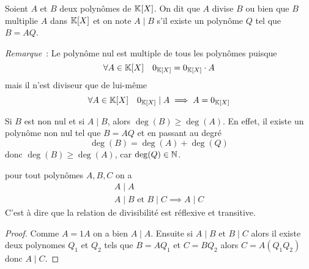 \begin{defdef}
  Soient \(A\) et \(B\) deux polynômes de \(\mathbb{K}[X]\). On dit que \(A\) divise \(B\) ou bien que \(B\) multiplie \(A\) dans \(\mathbb{K}[X]\) et on note \(A\mid{}B\) s'il existe un polynôme \(Q\) tel que \(B=AQ\).
\end{defdef}

\emph{Remarque}~: Le polynôme nul est multiple de tous les polynômes puisque
\begin{equation}
  \forall A \in \mathbb{K}[X] \quad 0_{\mathbb{K}[X]} = 0_{\mathbb{K}[X]} \cdot A
\end{equation}
mais il n'est diviseur que de lui-même
\begin{equation}
  \forall A \in \mathbb{K}[X] \quad 0_{\mathbb{K}[X]}\mid{}A \implies A=0_{\mathbb{K}[X]}
\end{equation}

Si \(B\) est non nul et si \(A\mid{}B\), alors \(\deg(B) \geqslant \deg(A)\). En effet, il existe un polynôme non nul tel que \(B=AQ\) et en passant au degré
\begin{equation}
  \deg(B) = \deg(A)+\deg(Q)
\end{equation}
donc \(\deg(B) \geqslant \deg(A)\), car \(\deg(Q)\in \mathbb{N}\).

\begin{prop}
  pour tout polynômes \(A,B,C\) on a
  \begin{align}
    A\mid{}A \\
    A\mid{}B \text{~et~} B\mid{}C \implies A\mid{}C
  \end{align}
C'est à dire que la relation de divisibilité est réflexive et transitive.
\end{prop}
\begin{proof}
  Comme \(A=1 A\) on a bien \(A\mid{}A\). Ensuite si \(A\mid{}B \text{~et~} B\mid{}C\) alors il existe deux polynomes \(Q_1\) et \(Q_2\) tels que \(B=AQ_1\) et \(C=BQ_2\) alors \(C=A(Q_1Q_2)\) donc \(A\mid{}C\).
\end{proof}


